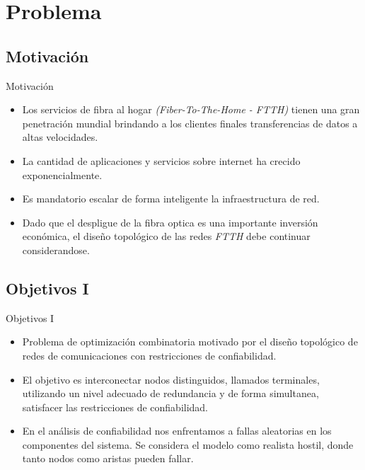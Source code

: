 \section{Problema}
\subsection{Motivación}
\begin{frame}%
    \begin{block}{Motivación}
    \begin{itemize} 
    	\item Los servicios de fibra al hogar \emph{(Fiber-To-The-Home - FTTH)} tienen una gran penetración mundial brindando a los clientes finales transferencias de datos a altas velocidades.
    	\item La cantidad de aplicaciones y servicios sobre internet ha crecido exponencialmente.
    	\item Es mandatorio escalar de forma inteligente la infraestructura de red.
    	\item Dado que el despligue de la fibra optica es una importante inversión económica, el diseño topológico de las redes \emph{FTTH} debe continuar considerandose.
	\end{itemize} 
    \end{block}
\end{frame}

\subsection{Objetivos I}
\begin{frame}%
    \begin{block}{Objetivos I}
	\begin{itemize} 
    	\item Problema de optimización combinatoria motivado por el diseño topológico de redes de comunicaciones 
con restricciones de confiabilidad.
		\item El objetivo es interconectar nodos distinguidos, llamados terminales, utilizando un nivel adecuado de redundancia y de forma simultanea, satisfacer las restricciones de confiabilidad.
	\item En el análisis de confiabilidad nos enfrentamos a fallas aleatorias en los componentes del sistema. Se considera el modelo como realista hostil, donde tanto nodos como aristas pueden fallar.
	\end{itemize} 
    \end{block}
\end{frame}

